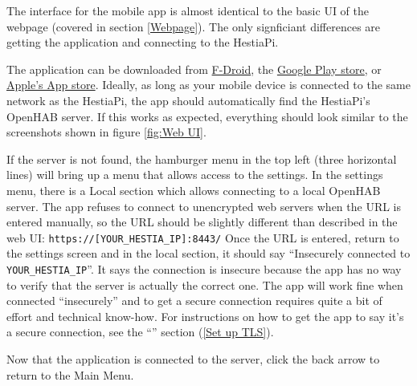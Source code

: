 The interface for the mobile app is almost identical to the basic UI of the
webpage (covered in section \ref{Webpage}).  The only signficiant differences
are getting the application and connecting to the HestiaPi.

The application can be downloaded from
\href{https://f-droid.org/en/packages/org.openhab.habdroid/}{F-Droid}, the
\href{https://play.google.com/store/apps/details?id=org.openhab.habdroid&hl=en_US}
{Google Play store}, or \href{https://apps.apple.com/us/app/openhab/id492054521}
{Apple's App store}. Ideally, as long as your mobile device is connected to
the same network as the HestiaPi, the app should automatically find the
HestiaPi's OpenHAB server. If this works as expected, everything should look
similar to the screenshots shown in figure \ref{fig:Web UI}.

If the server is not found, the hamburger menu in the top left (three
horizontal lines) will bring up a menu that allows access to the settings.  In
the settings menu, there is a Local section which allows connecting to a local
OpenHAB server.  The app refuses to connect to unencrypted web servers when the
URL is entered manually, so the URL should be slightly different than described
in the web UI: \texttt{https://[YOUR\_HESTIA\_IP]:8443/}  Once the URL is
entered, return to the settings screen and in the local section, it should say
``Insecurely connected to \texttt{YOUR\_HESTIA\_IP}''.  It says the connection
is insecure because the app has no way to verify that the server is actually
the correct one.  The app will work fine when connected ``insecurely'' and to
get a secure connection requires quite a bit of effort and technical know-how.
For instructions on how to get the app to say it's a secure connection, see
the ``'' section (\ref{Set up TLS}).

Now that the application is connected to the server, click the back arrow to
return to the Main Menu.
